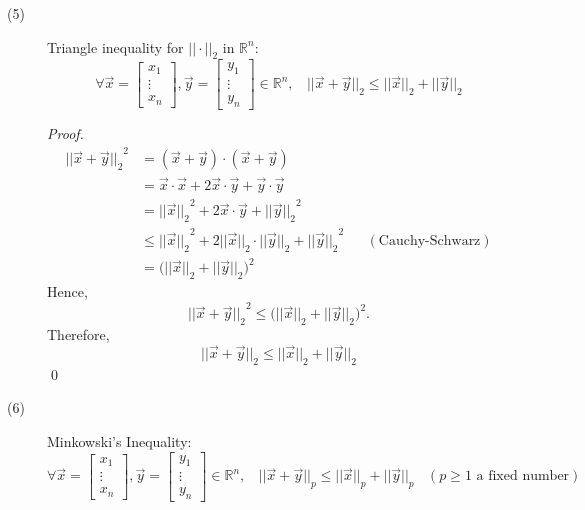 \begin{description}
    \item[(5)] Triangle inequality for $|| \cdot ||_2$ in $\mathbb{R}^n$:
    $$\forall \overrightarrow{x}=\begin{bmatrix}x_1\\ \vdots \\ x_n\end{bmatrix}, \overrightarrow{y}=\begin{bmatrix}y_1 \\ \vdots \\ y_n \end{bmatrix} \in \mathbb{R}^n, ~~~~ ||\overrightarrow{x} + \overrightarrow{y}||_2 \leq ||\overrightarrow{x}||_2 + ||\overrightarrow{y}||_2$$
    
    \begin{proof}
        \begin{align*}{||\overrightarrow{x} + \overrightarrow{y}||_2}^2 &= (\overrightarrow{x} + \overrightarrow{y}) \cdot (\overrightarrow{x} + \overrightarrow{y})  \\ &= \overrightarrow{x} \cdot \overrightarrow{x} + 2\overrightarrow{x} \cdot \overrightarrow{y} +\overrightarrow{y} \cdot \overrightarrow{y} \\ &= {||\overrightarrow{x}||_2}^2 + 2\overrightarrow{x} \cdot \overrightarrow{y} + {||\overrightarrow{y}||_2}^2 \\ &\leq {||\overrightarrow{x}||_2}^2 + 2{||\overrightarrow{x}||_2} \cdot {||\overrightarrow{y}||_2} + {||\overrightarrow{y}||_2}^2 &&(\text{Cauchy-Schwarz}) \\ &= \big({||\overrightarrow{x}||_2} + {||\overrightarrow{y}||_2} \big)^2 \end{align*}
        Hence,
        $${||\overrightarrow{x} + \overrightarrow{y}||_2}^2 \leq \big({||\overrightarrow{x}||_2} + {||\overrightarrow{y}||_2} \big)^2.$$Therefore, $$||\overrightarrow{x} + \overrightarrow{y}||_2 \leq {||\overrightarrow{x}||_2} + {||\overrightarrow{y}||_2}$$
        \qed
    \end{proof}
\end{description}

\begin{description}
    \item[(6)] Minkowski's Inequality: 
    $$\forall \overrightarrow{x}=\begin{bmatrix}x_1\\ \vdots \\ x_n\end{bmatrix}, \overrightarrow{y}=\begin{bmatrix}y_1 \\ \vdots \\ y_n \end{bmatrix} \in \mathbb{R}^n, ~~~~||\overrightarrow{x} + \overrightarrow{y}||_p \leq {||\overrightarrow{x}||_p} + {||\overrightarrow{y}||_p} ~~~~(p \geq1 \text{ a fixed number})$$ 
\end{description}

